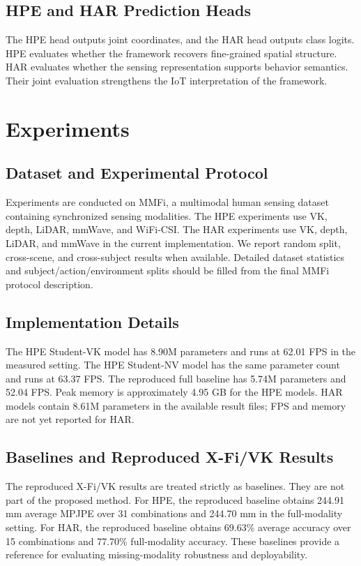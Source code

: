 \documentclass[journal]{IEEEtran}
\begin{document}
\subsection{HPE and HAR Prediction Heads}

The HPE head outputs joint coordinates, and the HAR head outputs class logits. HPE evaluates whether the framework recovers fine-grained spatial structure. HAR evaluates whether the sensing representation supports behavior semantics. Their joint evaluation strengthens the IoT interpretation of the framework.

\section{Experiments}

\subsection{Dataset and Experimental Protocol}

Experiments are conducted on MMFi, a multimodal human sensing dataset containing synchronized sensing modalities. The HPE experiments use VK, depth, LiDAR, mmWave, and WiFi-CSI. The HAR experiments use VK, depth, LiDAR, and mmWave in the current implementation. We report random split, cross-scene, and cross-subject results when available. Detailed dataset statistics and subject/action/environment splits should be filled from the final MMFi protocol description.

\subsection{Implementation Details}

The HPE Student-VK model has 8.90M parameters and runs at 62.01 FPS in the measured setting. The HPE Student-NV model has the same parameter count and runs at 63.37 FPS. The reproduced full baseline has 5.74M parameters and 52.04 FPS. Peak memory is approximately 4.95 GB for the HPE models. HAR models contain 8.61M parameters in the available result files; FPS and memory are not yet reported for HAR.

\subsection{Baselines and Reproduced X-Fi/VK Results}

The reproduced X-Fi/VK results are treated strictly as baselines. They are not part of the proposed method. For HPE, the reproduced baseline obtains 244.91 mm average MPJPE over 31 combinations and 244.70 mm in the full-modality setting. For HAR, the reproduced baseline obtains 69.63\% average accuracy over 15 combinations and 77.70\% full-modality accuracy. These baselines provide a reference for evaluating missing-modality robustness and deployability.
\end{document}
